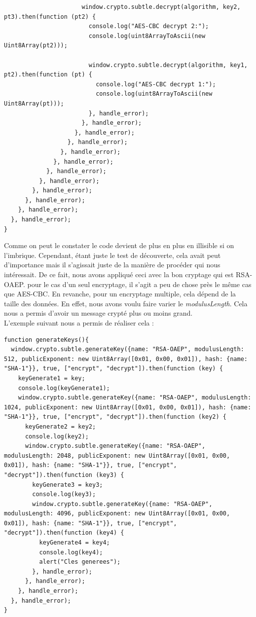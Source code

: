 \documentclass[a4paper,12pt]{report}
\begin{document}
\begin{lstlisting}
                      window.crypto.subtle.decrypt(algorithm, key2, pt3).then(function (pt2) {
                        console.log("AES-CBC decrypt 2:");
                        console.log(uint8ArrayToAscii(new Uint8Array(pt2)));

                        window.crypto.subtle.decrypt(algorithm, key1, pt2).then(function (pt) {
                          console.log("AES-CBC decrypt 1:");
                          console.log(uint8ArrayToAscii(new Uint8Array(pt)));
                        }, handle_error);
                      }, handle_error);
                    }, handle_error);
                  }, handle_error);
                }, handle_error);
              }, handle_error);
            }, handle_error);
          }, handle_error);
        }, handle_error);
      }, handle_error);
    }, handle_error);
  }, handle_error);
}
	\end{lstlisting} 
	Comme on peut le constater le code devient de plus en plus en illisible si on l'imbrique. Cependant, étant juste le test de découverte, cela avait peut d'importance mais il s'agissait juste de la manière de procéder qui nous intéressait. De ce fait, nous avons appliqué ceci avec la bon cryptage qui est RSA-OAEP. pour le cas d'un seul encryptage, il s'agit a peu de chose près le même cas que AES-CBC. En revanche, pour un encryptage multiple, cela dépend de la taille des données. En effet, nous avons voulu faire varier le \textit{modulusLength}. Cela nous a permis d'avoir un message crypté plus ou moins grand.\\ L'exemple suivant nous a permis de réaliser cela : 
	\begin{lstlisting}
function generateKeys(){
  window.crypto.subtle.generateKey({name: "RSA-OAEP", modulusLength: 512, publicExponent: new Uint8Array([0x01, 0x00, 0x01]), hash: {name: "SHA-1"}}, true, ["encrypt", "decrypt"]).then(function (key) {
    keyGenerate1 = key;
    console.log(keyGenerate1);
    window.crypto.subtle.generateKey({name: "RSA-OAEP", modulusLength: 1024, publicExponent: new Uint8Array([0x01, 0x00, 0x01]), hash: {name: "SHA-1"}}, true, ["encrypt", "decrypt"]).then(function (key2) {
      keyGenerate2 = key2;
      console.log(key2);
      window.crypto.subtle.generateKey({name: "RSA-OAEP", modulusLength: 2048, publicExponent: new Uint8Array([0x01, 0x00, 0x01]), hash: {name: "SHA-1"}}, true, ["encrypt", "decrypt"]).then(function (key3) {
        keyGenerate3 = key3;
        console.log(key3);
        window.crypto.subtle.generateKey({name: "RSA-OAEP", modulusLength: 4096, publicExponent: new Uint8Array([0x01, 0x00, 0x01]), hash: {name: "SHA-1"}}, true, ["encrypt", "decrypt"]).then(function (key4) {
          keyGenerate4 = key4;
          console.log(key4);
          alert("Cles generees");
        }, handle_error);
      }, handle_error);
    }, handle_error);
  }, handle_error);
}	
	\end{lstlisting}
\end{document}
